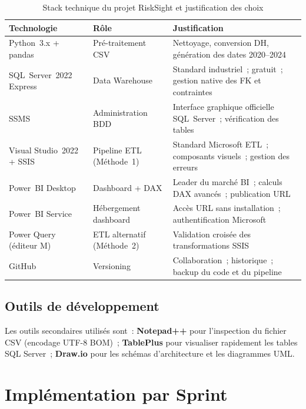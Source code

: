\documentclass[12pt, a4paper]{report}
\begin{document}
\begin{table}[H]
\centering
\caption{Stack technique du projet RiskSight et justification des choix}
\label{tab:stack_realisation}
\renewcommand{\arraystretch}{1.3}
\begin{tabularx}{\textwidth}{p{4cm} p{3.5cm} X}
\toprule
\rowcolor{primary!12}
Technologie & Rôle & Justification \\
\midrule
Python~3.x + pandas & Pré-traitement CSV & Nettoyage, conversion DH, génération des dates 2020--2024 \\
SQL~Server~2022 Express & Data Warehouse & Standard industriel~; gratuit~; gestion native des FK et contraintes \\
SSMS & Administration BDD & Interface graphique officielle SQL~Server~; vérification des tables \\
Visual Studio~2022 + SSIS & Pipeline ETL (Méthode~1) & Standard Microsoft ETL~; composants visuels~; gestion des erreurs \\
Power~BI Desktop & Dashboard + DAX & Leader du marché BI~; calculs DAX avancés~; publication URL \\
Power~BI Service & Hébergement dashboard & Accès URL sans installation~; authentification Microsoft \\
Power Query (éditeur M) & ETL alternatif (Méthode~2) & Validation croisée des transformations SSIS \\
GitHub & Versioning & Collaboration~; historique~; backup du code et du pipeline \\
\bottomrule
\end{tabularx}
\end{table}

\subsection{Outils de développement}

Les outils secondaires utilisés sont~: \textbf{Notepad++} pour l'inspection du
fichier CSV (encodage UTF-8 BOM)~; \textbf{TablePlus} pour visualiser rapidement
les tables SQL Server~; \textbf{Draw.io} pour les schémas d'architecture et les
diagrammes UML.

\section{Implémentation par Sprint}
\end{document}
